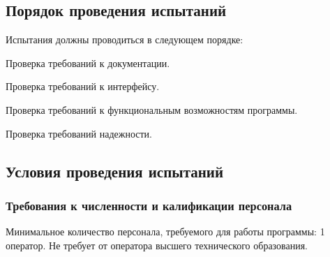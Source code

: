 \subsection{Порядок проведения испытаний}
Испытания должны проводиться в следующем порядке:
\begin{my_enumerate}
\item Проверка требований к документации.
\item Проверка требований к интерфейсу.
\item Проверка требований к функциональным возможностям программы.
\item Проверка требований надежности.
\end{my_enumerate}


\subsection{Условия проведения испытаний}

\subsubsection{Требования к численности и калификации персонала}
Минимальное количество персонала, требуемого для работы программы: 1 оператор.  Не требует от оператора высшего технического образования. 